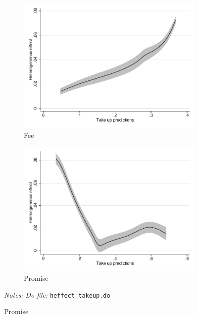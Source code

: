 \documentclass[11pt]{article}
\begin{document}
\begin{figure}[H]
    \caption{Propensity to take up the commitment device}
    \label{prop_take_up_hte}
    \begin{center}
     \begin{subfigure}{0.45\textwidth}
        \caption{Fee}
        \centering
        \includegraphics[width=\textwidth]{Figuras/takeup_fee_he.pdf}
    \end{subfigure}
     \begin{subfigure}{0.45\textwidth}
        \caption{Promise}
        \centering
        \includegraphics[width=\textwidth]{Figuras/takeup_promise_he.pdf}
    \end{subfigure}
\end{center}
     \footnotesize \textit{Notes: } 
      \footnotesize{ \textit{Do file: }  \texttt{heffect\_takeup.do}}
\end{figure}
\end{document}
